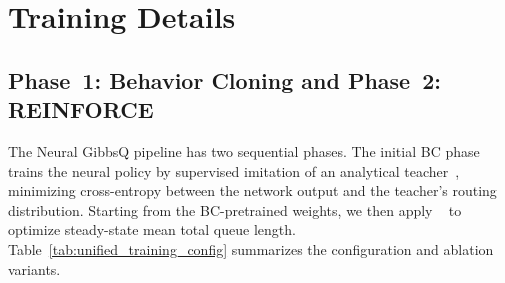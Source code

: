 \section{Training Details}
\label{sec:appendix_training}

\subsection{Phase~1: Behavior Cloning and Phase~2: REINFORCE}

The Neural GibbsQ pipeline has two sequential phases. The initial BC phase trains the neural policy by supervised imitation of an analytical teacher~\cite{ross2011reduction}, minimizing cross-entropy between the network output and the teacher's routing distribution. Starting from the BC-pretrained weights, we then apply \reinforce{}~\cite{williams1992simple} to optimize steady-state mean total queue length. Table~\ref{tab:unified_training_config} summarizes the configuration and ablation variants.

